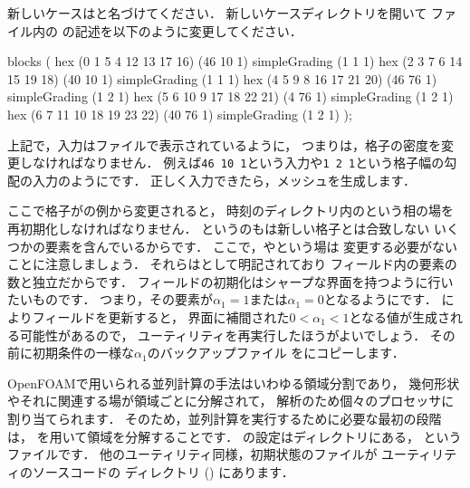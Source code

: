 新しいケースはと名づけてください．
新しいケースディレクトリを開いて
ファイル内の
の記述を以下のように変更してください．
\begin{OFverbatim}[file]
blocks
(
    hex (0 1 5 4 12 13 17 16) (46 10 1) simpleGrading (1 1 1)
    hex (2 3 7 6 14 15 19 18) (40 10 1) simpleGrading (1 1 1)
    hex (4 5 9 8 16 17 21 20) (46 76 1) simpleGrading (1 2 1)
    hex (5 6 10 9 17 18 22 21) (4 76 1) simpleGrading (1 2 1)
    hex (6 7 11 10 18 19 23 22) (40 76 1) simpleGrading (1 2 1)
);
\end{OFverbatim}
上記で，入力はファイルで表示されているように，
つまりは，格子の密度を変更しなければなりません．
例えば\texttt{46 10 1}という入力や\texttt{1 2 1}という格子幅の勾配の入力のようにです．
正しく入力できたら，メッシュを生成します．

ここで格子がの例から変更されると，
時刻のディレクトリ内のという相の場を
再初期化しなければなりません．
というのもは新しい格子とは合致しない
いくつかの要素を含んでいるからです．
ここで，やという場は
変更する必要がないことに注意しましょう．
それらはとして明記されており
フィールド内の要素の数と独立だからです．
フィールドの初期化はシャープな界面を持つように行いたいものです．
つまり，その要素が$\alpha_{1} = 1$または$\alpha_{1} = 0$となるようにです．
によりフィールドを更新すると，
界面に補間された$0 < \alpha_{1} < 1$となる値が生成される可能性があるので，
ユーティリティを再実行したほうがよいでしょう．
その前に初期条件の一様な$\alpha_{1}$のバックアップファイル
をにコピーします．

OpenFOAMで用いられる並列計算の手法はいわゆる領域分割であり，
幾何形状やそれに関連する場が領域ごとに分解されて，
解析のため個々のプロセッサに割り当てられます．
そのため，並列計算を実行するために必要な最初の段階は，
を用いて領域を分解することです．
の設定はディレクトリにある，
というファイルです．
他のユーティリティ同様，初期状態のファイルが
ユーティリティのソースコードの
ディレクトリ () にあります．

